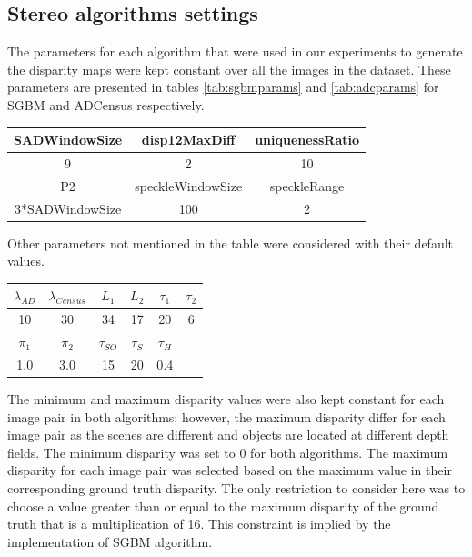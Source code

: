 \subsection{Stereo algorithms settings}
The parameters for each algorithm that were used in our experiments to generate the disparity
maps were kept constant over all the images in the dataset. These parameters are presented in tables \ref{tab:sgbmparams} and \ref{tab:adcparams} 
for SGBM and ADCensus respectively. \newline

{\footnotesize
\begin{minipage}{0.8\linewidth}
\begin{center}
\label{tab:sgbmparams}
\begin{tabular}{ |c|c|c| }
\hline
SADWindowSize & disp12MaxDiff & uniquenessRatio\\  \hline
9 & 2 & 10 \\ \hline
P2 & speckleWindowSize & speckleRange \\ \hline
3*SADWindowSize & 100 & 2  \\ \hline
\end{tabular}
\end{center}
\end{minipage} \newline \newline
}

Other parameters not mentioned in the table were considered with their default values. \newline


{\footnotesize
\begin{minipage}{0.8\linewidth}
\begin{center}
\label{tab:adcparams}
\begin{tabular}{|c|c|c|c|c|c|}
\hline
$\lambda_{AD}$ & $\lambda_{Census}$ & $L_{1}$ & $L_{2}$ & $\tau_{1}$ & $\tau_{2}$ \\  \hline
10 & 30 & 34 & 17 & 20 & 6  \\ \hline
$\pi_{1}$ & $\pi_{2}$ & $\tau_{SO}$ & $\tau_{S}$ & $\tau_{H}$ & \\  \hline
1.0 & 3.0 & 15 & 20 & 0.4 &  \\ \hline
\end{tabular}
\end{center}
\end{minipage} \newline
}

The minimum and maximum disparity values were also kept constant for each image pair in both algorithms; however, the maximum 
disparity differ for each image pair as the scenes are different
and objects are located at different depth fields.
The minimum disparity was set to $0$ for both algorithms. The maximum disparity for each image pair was selected based on the maximum value in their
corresponding ground truth disparity. The only restriction to consider here was to choose a value greater than or equal to 
the maximum disparity of the ground truth that is a multiplication of 16. This constraint
is implied by the implementation of SGBM algorithm.

